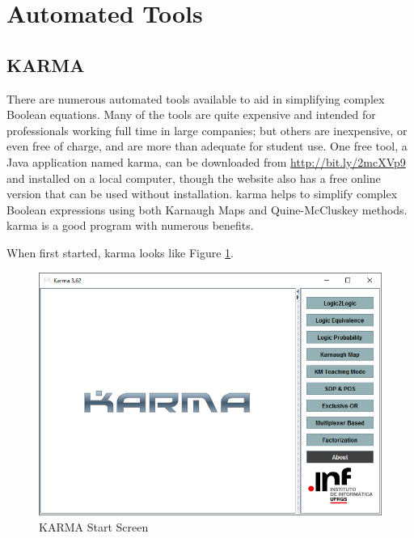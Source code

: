 \clearpage\section{Automated Tools}
\label{ASM:sec:automated_tools}

\subsection{KARMA}
\label{ASM:subsec:introduction_to_automated_tools}

There are numerous automated tools available to aid in simplifying complex Boolean equations. Many of the tools are quite expensive and intended for professionals working full time in large companies; but others are inexpensive, or even free of charge, and are more than adequate for student use. One free tool, a Java application named \gls{karma}, can be downloaded from \url{http://bit.ly/2mcXVp9} and installed on a local computer, though the website also has a free online version that can be used without installation. \Gls{karma} helps to simplify complex Boolean expressions using both Karnaugh Maps and Quine-McCluskey methods. \Gls{karma} is a good program with numerous benefits.

When first started, \gls{karma} looks like Figure \ref{fig:07_01}. 

\begin{figure}[H]
	\centering
	\includegraphics[width=\maxwidth{.95\linewidth}]{gfx/07_01}
	\caption{KARMA Start Screen}
	\label{fig:07_01}
\end{figure}

